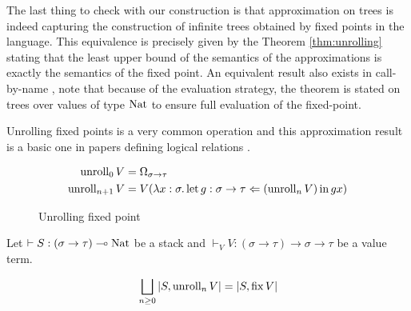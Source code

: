 The last thing to check with our construction is that approximation on trees 
is indeed capturing the construction of infinite trees obtained by fixed points 
in the language. This equivalence 
is precisely given by the Theorem \ref{thm:unrolling} stating that 
the least upper bound of the semantics of the approximations is 
exactly the semantics of the fixed point. An equivalent
result also exists in call-by-name \cite{gom}, note that 
because of the evaluation strategy, the theorem is stated 
on trees over values of type $\Nat$ to ensure full 
evaluation of the fixed-point.

Unrolling fixed points is a very common operation \cite{plotkin2001adequacy}
and this approximation result is a basic one in papers defining logical 
relations \cite{pitts1997operationally} \cite{Pitts2000}.

\begin{figure}[h]
    \begin{align*}
        \Unroll_0 V     &= \Omega_{\sigma \to \tau} \\
        \Unroll_{n+1} V &= 
        V (\lambda x : \sigma. \Bind{(\Unroll_n V)}{g : \sigma \to \tau}{gx})
    \end{align*}
    \caption{Unrolling fixed point}
    \label{fig:unrolling}
\end{figure}

\begin{atheorem}[Unrolling]
    \label{thm:unrolling}
    Let $\vdash S : (\sigma \to \tau) \multimap \Nat$ be a stack and 
    $\vdash_V V : (\sigma \to \tau) \to \sigma \to \tau$ be a 
    value term.

    \begin{equation*}
        \bigsqcup_{n \geq 0} |S, \Unroll_n V| = |S, \Fix V| 
    \end{equation*}
\end{atheorem}

